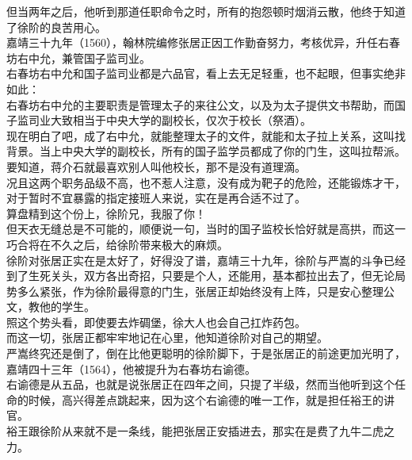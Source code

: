 \begin{multicols}{\theparacolNo}
但当两年之后，他听到那道任职命令之时，所有的抱怨顿时烟消云散，他终于知道了徐阶的良苦用心。\\

嘉靖三十九年（1560），翰林院编修张居正因工作勤奋努力，考核优异，升任右春坊右中允，兼管国子监司业。\\

右春坊右中允和国子监司业都是六品官，看上去无足轻重，也不起眼，但事实绝非如此：\\

右春坊右中允的主要职责是管理太子的来往公文，以及为太子提供文书帮助，而国子监司业大致相当于中央大学的副校长，仅次于校长（祭酒）。\\

现在明白了吧，成了右中允，就能整理太子的文件，就能和太子拉上关系，这叫找背景。当上中央大学的副校长，所有的国子监学员都成了你的门生，这叫拉帮派。要知道，蒋介石就最喜欢别人叫他校长，那不是没有道理滴。\\

况且这两个职务品级不高，也不惹人注意，没有成为靶子的危险，还能锻炼才干，对于暂时不宜暴露的指定接班人来说，实在是再合适不过了。\\

算盘精到这个份上，徐阶兄，我服了你！\\

但天衣无缝总是不可能的，顺便说一句，当时的国子监校长恰好就是高拱，而这一巧合将在不久之后，给徐阶带来极大的麻烦。\\

徐阶对张居正实在是太好了，好得没了谱，嘉靖三十九年，徐阶与严嵩的斗争已经到了生死关头，双方各出奇招，只要是个人，还能用，基本都拉出去了，但无论局势多么紧张，作为徐阶最得意的门生，张居正却始终没有上阵，只是安心整理公文，教他的学生。\\

照这个势头看，即使要去炸碉堡，徐大人也会自己扛炸药包。\\

而这一切，张居正都牢牢地记在心里，他知道徐阶对自己的期望。\\

严嵩终究还是倒了，倒在比他更聪明的徐阶脚下，于是张居正的前途更加光明了，嘉靖四十三年（1564），他被提升为右春坊右谕德。\\

右谕德是从五品，也就是说张居正在四年之间，只提了半级，然而当他听到这个任命的时候，高兴得差点跳起来，因为这个右谕德的唯一工作，就是担任裕王的讲官。\\

裕王跟徐阶从来就不是一条线，能把张居正安插进去，那实在是费了九牛二虎之力。\\


\end{multicols}
